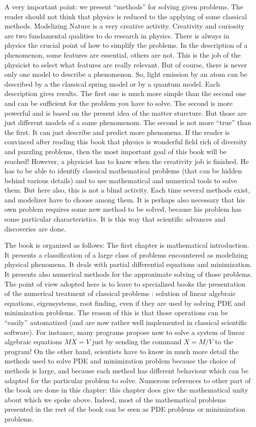 \documentclass[12pt]{book}
\begin{document}
A very important point: we present ``methods'' for solving given problems. The
reader should not think that physics is reduced to the applying of some
classical methods. Modelizing Nature is a very creative activity. Creativity
and 
curiosity are two fundamental qualities to do research in physics. There is
always in physics the crucial point of how to simplify the problems. In the
description of a phenomenon, some features are essential, others are not. This
is the job of the physicist to select what features are really relevant. But
of course, there is never only one model to describe a phenomenon. So,
light emission by an atom can be described by a
the classical spring model  or by a quantum model. Each description
gives results. The first one is much more simple 
than the second one and can be sufficient for the problem you have to
solve. The second is more powerful and is based on the present idea of
the matter sturcture. But those are just different models of a
same phenomenom. The second is not more ``true'' than the first. It can just
describe and predict more phenomena.
If the reader is convinced after reading this book that physics is wonderful
field rich of diversity and puzzling problems, then the most important goal of
this book will be reached!
However, a physicist has to know when the creativity job is finished. He has
to be able to identify classical mathematical problems (that can be hidden
behind various details) and to use mathematical and numerical tools to solve
them. But here also, this is not a blind activity. Each time several methods
exist, and modelizer have to choose among them. It is perhaps also necessary
that his own problem requires some new method to be solved, because his
problem has some particular characteristics. It is this way that scientific
advances and discoveries are done.

The book is organized as follows:
The first chapter is mathematical introduction. It presents a
classification 
of a large class of problems encountered as modelizing physical phenomena. It
deals with partial differential equations and minimization. It presents also
numerical methods for the approximate solving of those problems. The point of
view adopted here is to leave to specialized books the presentation of the
numerical treatment of classical problems : solution of linear algebraic
equations, eigensystems, root finding, even if they are used by solving PDE
and minimization problems. The reason of this is that those operations can be
``easily'' automatized (and are now
rather well implemented in classical scientific software). For instance, many
programs propose now to solve a system of linear algebraic equations $MX=V$
just by sending the command $X=M/V$ to the program!
On the other hand, scientists have to know in much more detail the methods used
to solve PDE and minimization problem because the choice of methods is large,
and because each method has different behaviour which can be adapted for the
particular problem to solve.
Numerous references to other part of the book are done in this chapter: this
chapter does give the mathematical unity about which we spoke above. Indeed,
most of the mathematical problems presented in the rest of the book can be
seen as PDE problems or minimization problems.
\end{document}

